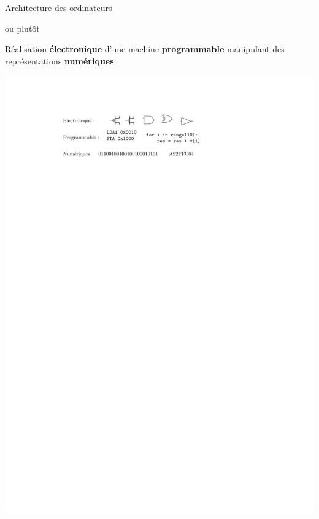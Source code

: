 \documentclass{beamer}
\begin{document}
\begin{frame}
\begin{center}
Architecture des ordinateurs
\end{center}
ou plutôt
\begin{center}
Réalisation \textbf{électronique} d'une machine \textbf{programmable} manipulant des représentations \textbf{numériques}
\end{center}
\includegraphics[width=\linewidth]{Figs/intro_elecprognum.pdf}
\end{frame}
\end{document}
